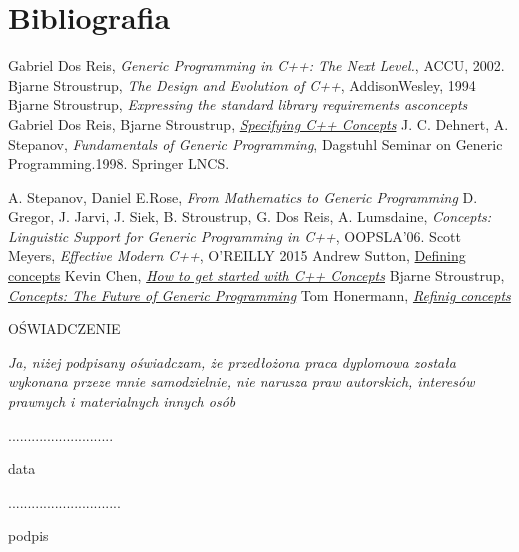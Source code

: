 \documentclass[11pt, a4paper]{article}
\begin{document}
	\newpage
	
	\section{Bibliografia}
	\begin{thebibliography}{6}
	
	 Gabriel Dos Reis, \emph{Generic Programming in C++: The Next Level.}, ACCU, 2002.
	 Bjarne Stroustrup, \emph{The Design and Evolution of C++}, AddisonWesley, 1994
	  Bjarne Stroustrup, \emph{Expressing the standard library requirements asconcepts}	
	 Gabriel Dos Reis, Bjarne Stroustrup, \href{http://www.stroustrup.com/popl06.pdf}{\emph{Specifying C++ Concepts}}
	 J. C. Dehnert, A. Stepanov, \emph{Fundamentals of Generic Programming}, Dagstuhl Seminar on Generic Programming.1998. Springer LNCS.

	 A. Stepanov, Daniel E.Rose, \emph{From Mathematics to Generic Programming}
	 D. Gregor, J. Jarvi, J. Siek, B. Stroustrup, G. Dos Reis, A. Lumsdaine, \emph{Concepts: Linguistic Support for Generic Programming in C++}, OOPSLA’06.
	 Scott Meyers, \emph{Effective Modern C++}, O'REILLY 2015
	 Andrew Sutton, \href{https://accu.org/index.php/journals/2198}{Defining concepts}
	 Kevin Chen, \href{https://kevinchen.co/blog/how-to-get-started-cpp-concepts/}{\emph{How to get started with C++ Concepts}}
	 Bjarne Stroustrup, \href{http://www.stroustrup.com/good_concepts.pdf}{\emph{Concepts: The Future of Generic Programming}}
	 Tom Honermann, \href{http://honermann.net/blog/category/c-concepts/}{\emph{Refinig concepts}}
	\end{thebibliography}
	\newpage
	\begin{center}
	OŚWIADCZENIE	
	\end{center}
	
	\emph{Ja, niżej podpisany oświadczam, że przedłożona praca dyplomowa została wykonana przeze mnie samodzielnie, nie narusza praw autorskich, interesów prawnych i materialnych innych osób}\newline\newline
	
	\begin{minipage}[t]{7cm}
	\flushleft
	\noindent \textsc{...........................}

	data
	\end{minipage}
	\hfill
	\begin{minipage}[t]{7cm}
	\flushright
	\textsc{.............................}

	podpis
	\end{minipage}
\end{document}
